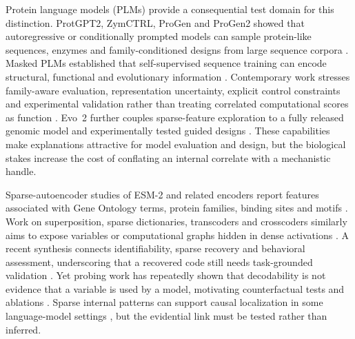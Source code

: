 \documentclass[pdflatex,sn-nature]{sn-jnl}
\begin{document}
Protein language models (PLMs) provide a consequential test domain for this distinction. ProtGPT2, ZymCTRL, ProGen and ProGen2 showed that autoregressive or conditionally prompted models can sample protein-like sequences, enzymes and family-conditioned designs from large sequence corpora \cite{ferruz2022protgpt2,munsamy2022zymctrl,madani2023large,nijkamp2023progen2}. Masked PLMs established that self-supervised sequence training can encode structural, functional and evolutionary information \cite{rives2021biological,elnaggar2022prottrans,rao2021structure,lin2023esm}. Contemporary work stresses family-aware evaluation, representation uncertainty, explicit control constraints and experimental validation rather than treating correlated computational scores as function \cite{alwer2026kinform,dumontet2026enzyme,prabakaran2026uncertainty,zhu2026controllable,watson2023rfdiffusion}. Evo~2 further couples sparse-feature exploration to a fully released genomic model and experimentally tested guided designs \cite{brixi2026evo2}. These capabilities make explanations attractive for model evaluation and design, but the biological stakes increase the cost of conflating an internal correlate with a mechanistic handle.

Sparse-autoencoder studies of ESM-2 and related encoders report features associated with Gene Ontology terms, protein families, binding sites and motifs \cite{gujral2025proteinSAE,adams2025mechanisticBiology,simon2025interplm}. Work on superposition, sparse dictionaries, transcoders and crosscoders similarly aims to expose variables or computational graphs hidden in dense activations \cite{elhage2022toy,bricken2023monosemanticity,cunningham2024sparse,templeton2024scaling,dunefsky2024transcoders,ameisen2025circuit,lindsey2024crosscoders}. A recent synthesis connects identifiability, sparse recovery and behavioral assessment, underscoring that a recovered code still needs task-grounded validation \cite{klindt2026unifying}. Yet probing work has repeatedly shown that decodability is not evidence that a variable is used by a model, motivating counterfactual tests and ablations \cite{hewitt2019control,elazar2021amnesic,meng2022rome,wang2023ioi}. Sparse internal patterns can support causal localization in some language-model settings \cite{wu2025sparsepatterns}, but the evidential link must be tested rather than inferred.
\end{document}
